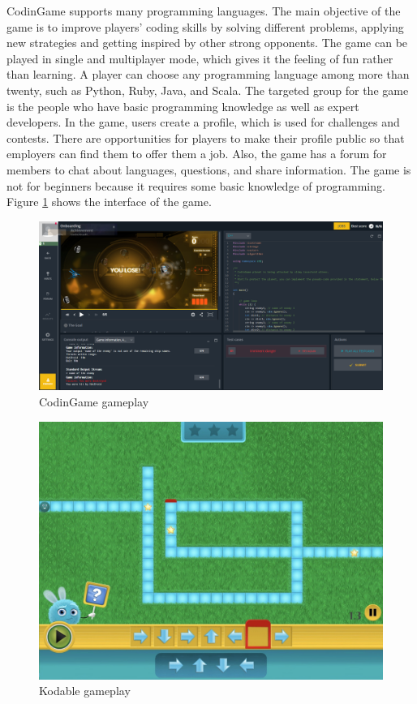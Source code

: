 CodinGame \cite{Codingame} supports many programming languages. The main objective of the game is to improve players’ coding skills by solving different problems, applying new strategies and getting inspired by other strong opponents. The game can be played in single and multiplayer mode, which gives it the feeling of fun rather than learning. A player can choose any programming language among more than twenty, such as Python, Ruby, Java, and Scala. The targeted group for the game is the people who have basic programming knowledge as well as expert developers. In the game, users create a profile, which is used for challenges and contests. There are opportunities for players to make their profile public so that employers can find them to offer them a job. Also, the game has a forum for members to chat about languages, questions, and share information. The game is not for beginners because it requires some basic knowledge of programming. Figure \ref{fig:CodinGame} shows the interface of the game.

\begin{figure}[ht!]
	\includegraphics[width=\columnwidth]{images/CodinGame.PNG}
    \caption{CodinGame gameplay}
    \label{fig:CodinGame}
\end{figure}

\begin{figure}[hbt!]
  	\includegraphics[width=\columnwidth]{images/Kodable.PNG}
    \caption{Kodable gameplay}
    \label{fig:Kodable}
\end{figure}

